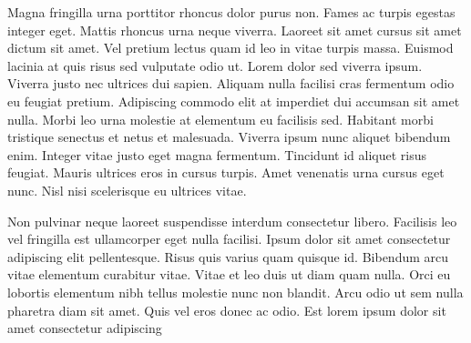 \documentclass[conference]{IEEEtran}
\begin{document}
Magna fringilla urna porttitor rhoncus dolor purus non. Fames ac turpis egestas integer eget. Mattis rhoncus urna neque viverra. Laoreet sit amet cursus sit amet dictum sit amet. Vel pretium lectus quam id leo in vitae turpis massa. Euismod lacinia at quis risus sed vulputate odio ut. Lorem dolor sed viverra ipsum. Viverra justo nec ultrices dui sapien. Aliquam nulla facilisi cras fermentum odio eu feugiat pretium. Adipiscing commodo elit at imperdiet dui accumsan sit amet nulla. Morbi leo urna molestie at elementum eu facilisis sed. Habitant morbi tristique senectus et netus et malesuada. Viverra ipsum nunc aliquet bibendum enim. Integer vitae justo eget magna fermentum. Tincidunt id aliquet risus feugiat. Mauris ultrices eros in cursus turpis. Amet venenatis urna cursus eget nunc. Nisl nisi scelerisque eu ultrices vitae.

Non pulvinar neque laoreet suspendisse interdum consectetur libero. Facilisis leo vel fringilla est ullamcorper eget nulla facilisi. Ipsum dolor sit amet consectetur adipiscing elit pellentesque. Risus quis varius quam quisque id. Bibendum arcu vitae elementum curabitur vitae. Vitae et leo duis ut diam quam nulla. Orci eu lobortis elementum nibh tellus molestie nunc non blandit. Arcu odio ut sem nulla pharetra diam sit amet. Quis vel eros donec ac odio. Est lorem ipsum dolor sit amet consectetur adipiscing
\end{document}
